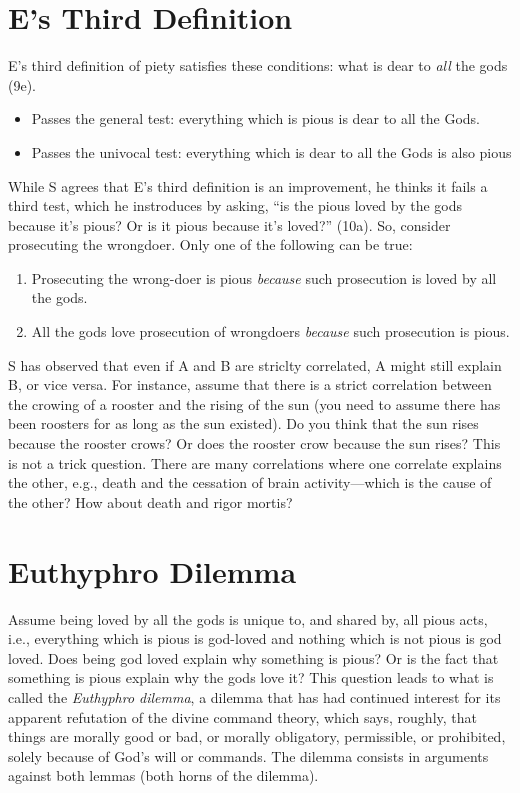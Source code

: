 \documentclass[oneside]{article}
\begin{document}
\section*{E's Third Definition}
E's third definition of piety satisfies these conditions: what is dear to \emph{all} the gods (9e). 
\begin{itemize} 
\item Passes the general test:  everything which is pious is dear to all the Gods. 
\item Passes the univocal test: everything which is dear to all the Gods is also pious
\end{itemize}
While S agrees that E's third definition is an improvement, he thinks it fails a third test, which he instroduces by asking, ``is the pious loved by the gods because it's pious? Or is it pious because it's loved?'' (10a). So, consider prosecuting the wrongdoer. Only one of the following can be true:
\begin{enumerate}
\item Prosecuting the wrong-doer is pious \emph{because} such prosecution is loved by all the gods.
\item All the gods love prosecution of wrongdoers \emph{because} such prosecution is pious.
\end{enumerate}
S has observed that even if A and B are striclty correlated, A might still explain B, or vice versa. For instance, assume that there is a strict correlation between the crowing of a rooster and the rising of the sun (you need to assume there has been roosters for as long as the sun existed). Do you think that the sun rises because the rooster crows? Or does the rooster crow because the sun rises? This is not a trick question. There are many correlations where one correlate explains the other, e.g., death and the cessation of brain activity---which is the cause of the other? How about death and rigor mortis?



\section*{Euthyphro Dilemma}
Assume being loved by all the gods is unique to, and shared by, all pious acts, i.e., everything which is pious is god-loved and nothing which is not pious is god loved. Does being god loved explain why something is pious? Or is the fact that something is pious explain why the gods love it? This question leads to what is called the \emph{Euthyphro dilemma}, a dilemma that has had continued interest for its apparent refutation of the divine command theory, which says, roughly, that things are morally good or bad, or morally obligatory, permissible, or prohibited, solely because of God’s will or commands. The dilemma consists in arguments against both lemmas (both horns of the dilemma).\\
\end{document}

